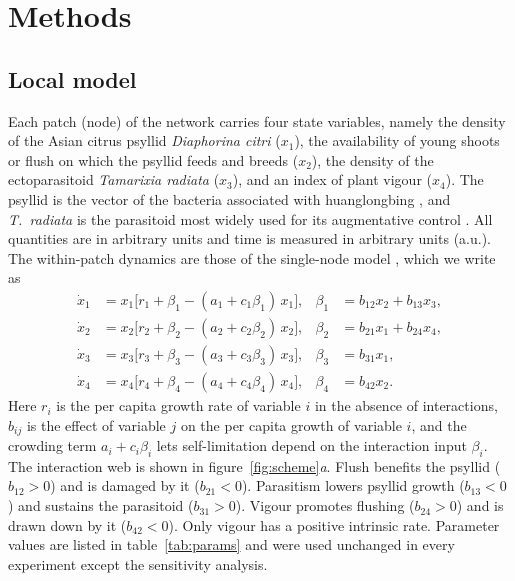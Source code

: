 \section{Methods}
\label{sec:methods}

\subsection{Local model}
\label{sec:local}

Each patch (node) of the network carries four state variables, namely the density of the Asian citrus psyllid \emph{Diaphorina citri} ($x_1$), the availability of young shoots or flush on which the psyllid feeds and breeds ($x_2$), the density of the ectoparasitoid \emph{Tamarixia radiata} ($x_3$), and an index of plant vigour ($x_4$). The psyllid is the vector of the bacteria associated with huanglongbing \citep{grafton2013,hall2013}, and \emph{T.~radiata} is the parasitoid most widely used for its augmentative control \citep{chen2014}. All quantities are in arbitrary units and time is measured in arbitrary units (a.u.). The within-patch dynamics are those of the single-node model \citep{RodriguezFalcon2026}, which we write as
\begin{align}
\dot x_1 &= x_1\bigl[r_1 + \beta_1 - (a_1 + c_1\beta_1)\,x_1\bigr], & \beta_1 &= b_{12}x_2 + b_{13}x_3,\nonumber\\
\dot x_2 &= x_2\bigl[r_2 + \beta_2 - (a_2 + c_2\beta_2)\,x_2\bigr], & \beta_2 &= b_{21}x_1 + b_{24}x_4,\label{eq:local}\\
\dot x_3 &= x_3\bigl[r_3 + \beta_3 - (a_3 + c_3\beta_3)\,x_3\bigr], & \beta_3 &= b_{31}x_1,\nonumber\\
\dot x_4 &= x_4\bigl[r_4 + \beta_4 - (a_4 + c_4\beta_4)\,x_4\bigr], & \beta_4 &= b_{42}x_2.\nonumber
\end{align}
Here $r_i$ is the per capita growth rate of variable $i$ in the absence of interactions, $b_{ij}$ is the effect of variable $j$ on the per capita growth of variable $i$, and the crowding term $a_i + c_i\beta_i$ lets self-limitation depend on the interaction input $\beta_i$. The interaction web is shown in figure~\ref{fig:scheme}\emph{a}. Flush benefits the psyllid ($b_{12}>0$) and is damaged by it ($b_{21}<0$). Parasitism lowers psyllid growth ($b_{13}<0$) and sustains the parasitoid ($b_{31}>0$). Vigour promotes flushing ($b_{24}>0$) and is drawn down by it ($b_{42}<0$). Only vigour has a positive intrinsic rate. Parameter values are listed in table~\ref{tab:params} and were used unchanged in every experiment except the sensitivity analysis.

